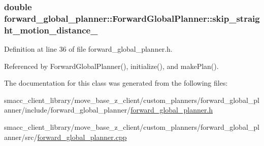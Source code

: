 \subsubsection[{\texorpdfstring{skip\+\_\+straight\+\_\+motion\+\_\+distance\+\_\+}{skip_straight_motion_distance_}}]{\setlength{\rightskip}{0pt plus 5cm}double forward\+\_\+global\+\_\+planner\+::\+Forward\+Global\+Planner\+::skip\+\_\+straight\+\_\+motion\+\_\+distance\+\_\+\hspace{0.3cm}{\ttfamily [private]}}\hypertarget{classforward__global__planner_1_1ForwardGlobalPlanner_a0e10cd64069d5723fbdb896fdcead82c}{}\label{classforward__global__planner_1_1ForwardGlobalPlanner_a0e10cd64069d5723fbdb896fdcead82c}


Definition at line 36 of file forward\+\_\+global\+\_\+planner.\+h.



Referenced by Forward\+Global\+Planner(), initialize(), and make\+Plan().



The documentation for this class was generated from the following files\+:\begin{DoxyCompactItemize}
\item 
smacc\+\_\+client\+\_\+library/move\+\_\+base\+\_\+z\+\_\+client/custom\+\_\+planners/forward\+\_\+global\+\_\+planner/include/forward\+\_\+global\+\_\+planner/\hyperlink{forward__global__planner_8h}{forward\+\_\+global\+\_\+planner.\+h}\item 
smacc\+\_\+client\+\_\+library/move\+\_\+base\+\_\+z\+\_\+client/custom\+\_\+planners/forward\+\_\+global\+\_\+planner/src/\hyperlink{forward__global__planner_8cpp}{forward\+\_\+global\+\_\+planner.\+cpp}\end{DoxyCompactItemize}
